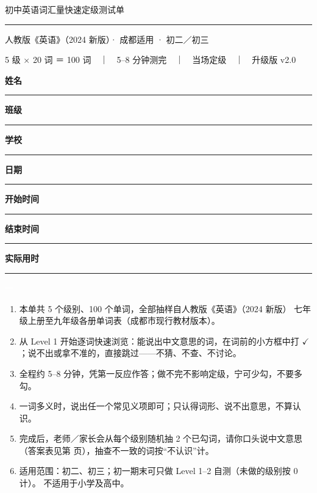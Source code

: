 \documentclass[UTF8, fontset=windows, a4paper, zihao=5]{ctexart}
\newcommand{\fillin}[1][2.3cm]{\rule[-0.45ex]{#1}{0.5pt}}
\newcommand{\Section}[3]{%
  \par\addvspace{1.5ex plus .3ex}%
  \needspace{5\baselineskip}%
  \noindent
  {\colorbox{main}{\textcolor{white}{\heiti\small\strut #1}}}%
  \hspace{0.8em}{\heiti\Large\textcolor{main}{#2}}%
  \hspace{0.6em}{\heiti\small\textcolor{main2}{#3}}\par
  \vspace{0.6ex}%
  \noindent{\textcolor{main!30}{\rule{\linewidth}{1pt}}}\par
  \addvspace{0.9ex}%
}
\begin{document}
\begin{tcolorbox}[enhanced, colback=main, colframe=main, arc=2.5mm,
  boxrule=0pt, left=6mm, right=6mm, top=5.5mm, bottom=5.5mm]
\centering
{\color{white}\heiti\fontsize{23}{28}\selectfont
 初中英语词汇量快速定级测试单}\par
\vspace{1.4mm}
{\color{accent!85}\rule{2.6cm}{1.6pt}}\par
\vspace{1.4mm}
{\color{white!92}\heiti\normalsize
 人教版《英语》（2024 新版）· 成都适用 · 初二／初三}\par
\vspace{0.9mm}
{\color{white!72}\footnotesize
 5 级 × 20 词 ＝ 100 词　｜　5–8 分钟测完　｜　当场定级　｜　升级版 v2.0}\par
\end{tcolorbox}

\vspace{1.2ex}
\begin{tcolorbox}[softbox]
{\small
\noindent
\textbf{姓名}\ \fillin[2.4cm]\hfill
\textbf{班级}\ \fillin[2.4cm]\hfill
\textbf{学校}\ \fillin[3.6cm]\par\vspace{1.5mm}
\noindent
\textbf{日期}\ \fillin[2.4cm]\hfill
\textbf{开始时间}\ \fillin[1.9cm]\hfill
\textbf{结束时间}\ \fillin[1.9cm]\hfill
\textbf{实际用时}\ \fillin[1.9cm]
}
\end{tcolorbox}

\Section{一}{测试说明}{学生用}\label{sec:info}
\begin{enumerate}[label=\textcolor{main}{\bfseries\arabic*.}]
\item 本单共 5 个级别、100 个单词，全部抽样自人教版《英语》（2024 新版）
  七年级上册至九年级各册单词表（成都市现行教材版本）。
\item 从 Level 1 开始逐词快速浏览：能说出中文意思的词，在词前的小方框中打
  \textcolor{accent}{$\checkmark$}；说不出或拿不准的，直接跳过——不猜、不查、不讨论。
\item 全程约 5–8 分钟，凭第一反应作答；做不完不影响定级，宁可少勾，不要多勾。
\item 一词多义时，说出任一个常见义项即可；只认得词形、说不出意思，不算认识。
\item 完成后，老师／家长会从每个级别随机抽 2 个已勾词，请你口头说中文意思
  （答案表见第 \pageref{sec:answers} 页），抽查不一致的词按“不认识”计。
\item 适用范围：初二、初三；初一期末可只做 Level 1–2 自测（未做的级别按 0 计）。
  不适用于小学及高中。
\end{enumerate}
\end{document}
